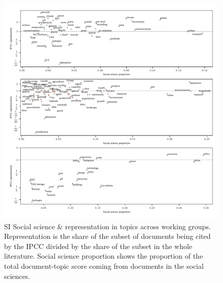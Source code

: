 \documentclass{article}
\begin{document}
	\begin{figure}
		\begin{center}
			\includegraphics[width=1\linewidth]{../plots_pub/wgs_socsci.pdf}
			\caption{SI Social science \& representation in topics across working groups. Representation is the share of the subset of documents being cited by the IPCC divided by the share of the subset in the whole literature. Social science proportion shows the proportion of the total document-topic score coming from documents in the social sciences.}
			\label{socsci-wgs}
		\end{center}
	\end{figure}
	
\end{document}
